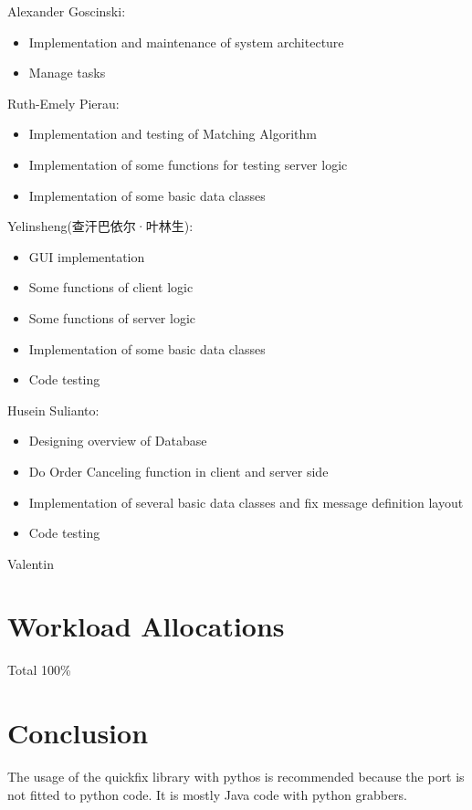 \documentclass[a4paper, 11pt]{article}
\begin{document}
Alexander Goscinski:
\begin{itemize}
  \item Implementation and maintenance of system architecture
  \item Manage tasks
\end{itemize}
Ruth-Emely Pierau:
\begin{itemize}
	\item Implementation and testing of Matching Algorithm
	\item Implementation of some functions for testing server logic
	\item Implementation of some basic data classes
\end{itemize}
Yelinsheng(查汗巴依尔·叶林生):
\begin{itemize}
  \item GUI implementation
  \item Some functions of client logic
  \item Some functions of server logic
  \item Implementation of some basic data classes
  \item Code testing
\end{itemize}
Husein Sulianto:
\begin{itemize}
  \item Designing overview of Database
  \item Do Order Canceling function in client and server side
  \item Implementation of several basic data classes and fix message definition layout
  \item Code testing
\end{itemize}
Valentin


\section*{Workload Allocations}
Total 100\% \\

\section*{Conclusion}
The usage of the quickfix library with pythos is recommended because the port is not fitted to python code. It is mostly Java code with python grabbers.
\end{document}
